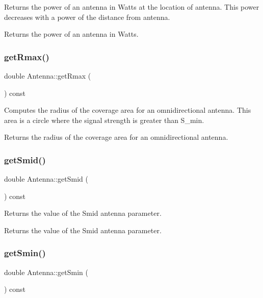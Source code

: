Returns the power of an antenna in Watts at the location of antenna. This power decreases with a power of the distance from antenna. \begin{DoxyReturn}{Returns}
the power of an antenna in Watts. 
\end{DoxyReturn}
\mbox{\label{class_antenna_adf33d1b0be85f95c543a31dc1b3159f5}} 
\subsubsection{\texorpdfstring{getRmax()}{getRmax()}}
{\footnotesize\ttfamily double Antenna\+::get\+Rmax (\begin{DoxyParamCaption}{ }\end{DoxyParamCaption}) const}

Computes the radius of the coverage area for an omnidirectional antenna. This area is a circle where the signal strength is greater than S\+\_\+min. \begin{DoxyReturn}{Returns}
the radius of the coverage area for an omnidirectional antenna. 
\end{DoxyReturn}
\mbox{\label{class_antenna_acfaf47d35cc742e76522ea31a8b01578}} 
\subsubsection{\texorpdfstring{getSmid()}{getSmid()}}
{\footnotesize\ttfamily double Antenna\+::get\+Smid (\begin{DoxyParamCaption}{ }\end{DoxyParamCaption}) const}

Returns the value of the Smid antenna parameter. \begin{DoxyReturn}{Returns}
the value of the Smid antenna parameter. 
\end{DoxyReturn}
\mbox{\label{class_antenna_a1955f59f9d3b20ffd8e79f4893bf2e61}} 
\subsubsection{\texorpdfstring{getSmin()}{getSmin()}}
{\footnotesize\ttfamily double Antenna\+::get\+Smin (\begin{DoxyParamCaption}{ }\end{DoxyParamCaption}) const}

